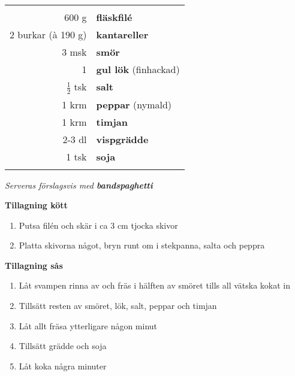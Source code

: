 \documentclass[a4paper,12pt]{article}
\newcommand{\tillb}[1]{\noindent \textit{Serveras förslagsvis med \textbf{#1}} \vspace{1cm}}
\begin{document}
\begin{table}[H]
	\begin{tabular}{rl}
	\hline
	&\\
		600 g & \textbf{fläskfilé}\\
		2 burkar (à 190 g) & \textbf{kantareller}\\
		3 msk & \textbf{smör}\\
		1 & \textbf{gul lök} (finhackad)\\
		$\frac{1}{2}$ tsk & \textbf{salt}\\
		1 krm & \textbf{peppar} (nymald)\\
		1 krm & \textbf{timjan}\\
		2-3 dl & \textbf{vispgrädde}\\
		1 tsk & \textbf{soja}\\
	&\\
	\hline
	\end{tabular}
\end{table}

\tillb{bandspaghetti}

\begin{multicols*}{2}

\noindent \textbf{Tillagning kött}
\begin{enumerate}
	\itemsep0cm
	\item Putsa filén och skär i ca 3 cm tjocka skivor
	\item Platta skivorna något, bryn runt om i stekpanna, salta och peppra
\end{enumerate}

\noindent \textbf{Tillagning sås}
\begin{enumerate}
	\itemsep0cm
	\item Låt svampen rinna av och fräs i hälften av smöret tills all vätska kokat in
	\item Tillsätt resten av smöret, lök, salt, peppar och timjan
	\item Låt allt fräsa ytterligare någon minut
	\item Tillsätt grädde och soja
	\item Låt koka några minuter
\end{enumerate}

\end{multicols*}

\clearpage

\end{document}
